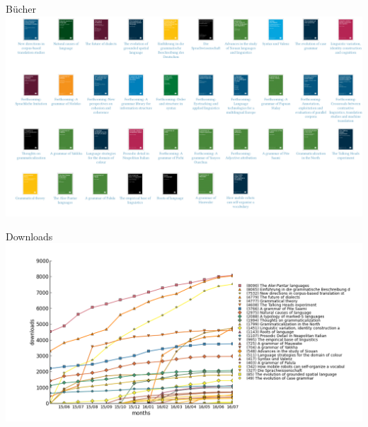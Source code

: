 \documentclass[final,utf8]{beamer}
\begin{document}
\begin{frame}{}
\begin{columns}[t]
\begin{column}{.45\linewidth}
    \begin{block}{B\"{u}cher}
      \includegraphics[width=.9\textwidth]{books.png}
    \end{block}  
  

    
    \begin{block}{Downloads}
      \includegraphics[width=.9\textwidth]{cumulativeall.png}
    \end{block}  
  


  \end{column}
\end{columns}
\vfill
\end{frame}
\end{document}
